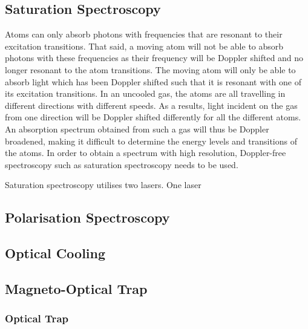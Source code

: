 \documentclass[twocolumn]{article}
\begin{document}

\subsection{Saturation Spectroscopy}
Atoms can only absorb photons with frequencies that are resonant to their excitation transitions. That said, a moving atom will not be able to absorb photons with these frequencies as their frequency will be Doppler shifted and no longer resonant to the atom transitions. The moving atom will only be able to absorb light which has been Doppler shifted such that it is resonant with one of its excitation transitions. In an uncooled gas, the atoms are all travelling in different directions with different speeds. As a results, light incident on the gas from one direction will be Doppler shifted differently for all the different atoms. An absorption spectrum obtained from such a gas will thus be Doppler broadened, making it difficult to determine the energy levels and transitions of the atoms. In order to obtain a spectrum with high resolution, Doppler-free spectroscopy such as saturation spectroscopy needs to be used. \\

\par Saturation spectroscopy utilises two lasers. One laser


\subsection{Polarisation Spectroscopy}

\subsection{Optical Cooling}

\subsection{Magneto-Optical Trap}
\subsubsection{Optical Trap}
\end{document}
